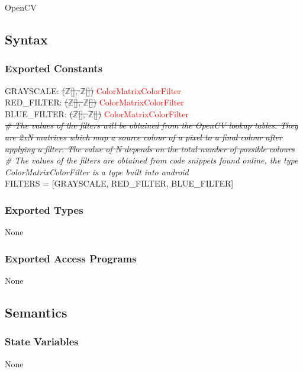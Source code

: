 \documentclass[12pt, titlepage]{article}
\begin{document}
OpenCV

\subsection* {Syntax}

\subsubsection* {Exported Constants}

GRAYSCALE: \sout{($\mathbb{Z}$[], $\mathbb{Z}$[])} \textcolor{red}{ColorMatrixColorFilter}\\
RED\_FILTER: \sout{($\mathbb{Z}$[], $\mathbb{Z}$[])} \textcolor{red}{ColorMatrixColorFilter} \\
BLUE\_FILTER: \sout{($\mathbb{Z}$[], $\mathbb{Z}$[])} \textcolor{red}{ColorMatrixColorFilter}\\
\sout{\textit{\# The values of the filters will be obtained from the OpenCV lookup tables. They are 2xN matrices which map a source colour of a pixel to a final colour after applying a filter. The value of N depends on the total number of possible colours}}\\
\textit{\# The values of the filters are obtained from code snippets found online, 
the type ColorMatrixColorFilter is a type built into android}\\
FILTERS = [GRAYSCALE, RED\_FILTER, BLUE\_FILTER]\\

\subsubsection* {Exported Types}

None

\subsubsection* {Exported Access Programs}

None

\subsection* {Semantics}

\subsubsection* {State Variables}

None
\end{document}
